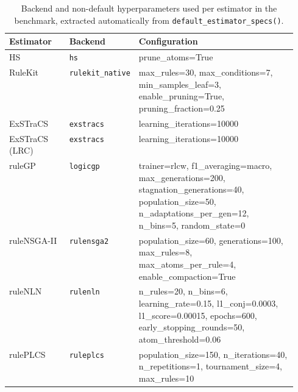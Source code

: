 \begin{table}[t]
\centering
\caption{Backend and non-default hyperparameters used per estimator in the benchmark, extracted automatically from \texttt{default\_estimator\_specs()}.}
\label{tab:hyperparameters}
\setlength{\tabcolsep}{4pt}
\footnotesize
\begin{tabular}{@{}llp{0.55\linewidth}@{}}
\toprule
Estimator & Backend & Configuration \\
\midrule
HS & \texttt{hs} & prune_atoms=True \\
RuleKit & \texttt{rulekit_native} & max_rules=30, max_conditions=7, min_samples_leaf=3, enable_pruning=True, pruning_fraction=0.25 \\
ExSTraCS & \texttt{exstracs} & learning_iterations=10000 \\
ExSTraCS (LRC) & \texttt{exstracs} & learning_iterations=10000 \\
ruleGP & \texttt{logicgp} & trainer=rlcw, f1_averaging=macro, max_generations=200, stagnation_generations=40, population_size=50, n_adaptations_per_gen=12, n_bins=5, random_state=0 \\
ruleNSGA-II & \texttt{rulensga2} & population_size=60, generations=100, max_rules=8, max_atoms_per_rule=4, enable_compaction=True \\
ruleNLN & \texttt{rulenln} & n_rules=20, n_bins=6, learning_rate=0.15, l1_conj=0.0003, l1_score=0.00015, epochs=600, early_stopping_rounds=50, atom_threshold=0.06 \\
rulePLCS & \texttt{ruleplcs} & population_size=150, n_iterations=40, n_repetitions=1, tournament_size=4, max_rules=10 \\
\bottomrule
\end{tabular}
\end{table}

